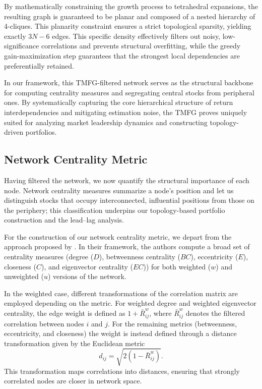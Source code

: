 \documentclass[fleqn]{rbfin}
\begin{document}
By mathematically constraining the growth process to tetrahedral expansions, the resulting graph is guaranteed to be planar and composed of a nested hierarchy of 4-cliques. This planarity constraint ensures a strict topological sparsity, yielding exactly $3N - 6$ edges. This specific density effectively filters out noisy, low-significance correlations and prevents structural overfitting, while the greedy gain-maximization step guarantees that the strongest local dependencies are preferentially retained.

In our framework, this TMFG-filtered network serves as the structural backbone for computing centrality measures and segregating central stocks from peripheral ones. By systematically capturing the core hierarchical structure of return interdependencies and mitigating estimation noise, the TMFG proves uniquely suited for analyzing market leadership dynamics and constructing topology-driven portfolios.

\subsection{Network Centrality Metric}

\noindent Having filtered the network, we now quantify the structural importance of each node. Network centrality measures summarize a node's position and let us distinguish stocks that occupy interconnected, influential positions from those on the periphery; this classification underpins our topology-based portfolio construction and the lead--lag analysis.

For the construction of our network centrality metric, we depart from the approach proposed by \citet{pozzi2013spread}. In their framework, the authors compute a broad set of centrality measures (degree ($D$), betweenness centrality ($BC$), eccentricity ($E$), closeness ($C$), and eigenvector centrality ($EC$)) for both weighted ($w$) and unweighted ($u$) versions of the network.

In the weighted case, different transformations of the correlation matrix are employed depending on the metric. For weighted degree and weighted eigenvector centrality, the edge weight is defined as $1 + \bar{R}_{ij}^w$, where $\bar{R}_{ij}^w$ denotes the filtered correlation between nodes $i$ and $j$. For the remaining metrics (betweenness, eccentricity, and closeness) the weight is instead defined through a distance transformation given by the Euclidean metric
\[
d_{ij} = \sqrt{2\left(1 - \bar{R}_{ij}^w\right)}.
\]
This transformation maps correlations into distances, ensuring that strongly correlated nodes are closer in network space.
\end{document}
